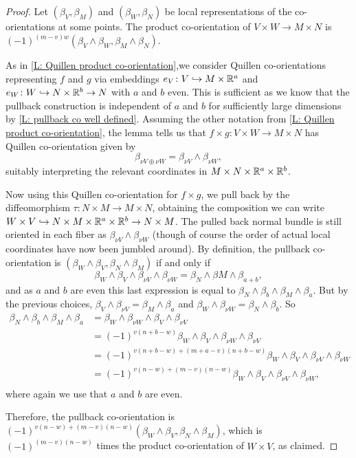 \begin{proof}
	Let $(\beta_V,\beta_M)$ and $(\beta_W,\beta_N)$ be local representations of the co-orientations at some points.
	The product co-orientation of $V \times W \to M \times N$ is $(-1)^{(m-v)w}(\beta_V \wedge \beta_W,\beta_M \wedge \beta_N)$.

	As in \cref{L: Quillen product co-orientation},we consider Quillen co-orientations representing $f$ and $g$ via embeddings $e_V \colon V \hookrightarrow M \times \mathbb{R}^a$ and $e_W \colon W \hookrightarrow N \times \mathbb{R}^b \to N$ with $a$ and $b$ even.
	This is sufficient as we know that the pullback construction is independent of $a$ and $b$ for sufficiently large dimensions by \cref{L: pullback co well defined}.
	Assuming the other notation from \cref{L: Quillen product co-orientation}, the lemma tells us that $f \times g \colon V \times W \to M \times N$ has Quillen co-orientation given by $$\beta_{\nu V \oplus \nu W} = \beta_{\nu V} \wedge \beta_{\nu W},$$
	suitably interpreting the relevant coordinates in $M \times N \times \mathbb{R}^a \times \mathbb{R}^b$.

	Now using this Quillen co-orientation for $f \times g$, we pull back by the diffeomorphism $\tau \colon N \times M \to M \times N$, obtaining the composition we can write $W \times V \hookrightarrow N \times M \times \mathbb{R}^a \times \mathbb{R}^b \to N \times M$.
	The pulled back normal bundle is still oriented in each fiber as $\beta_{\nu V} \wedge \beta_{\nu W}$ (though of course the order of actual local coordinates have now been jumbled around).
	By definition, the pullback co-orientation is $(\beta_W \wedge \beta_V,\beta_N \wedge \beta_M)$ if and only if $$\beta_W \wedge \beta_V \wedge \beta_{\nu V} \wedge \beta_{\nu W} = \beta_N \wedge \beta M \wedge \beta_{a+b},$$
	and as $a$ and $b$ are even this last expression is equal to
	$\beta_N \wedge \beta_b \wedge \beta_M \wedge \beta_{a}.$ But by the previous choices, $\beta_V \wedge \beta_{\nu V} = \beta_M \wedge \beta_a$ and $\beta_W \wedge \beta_{\nu W} = \beta_N \wedge \beta_b$.
	So
	\begin{align*}
		\beta_N \wedge \beta_b \wedge \beta_M \wedge \beta_{a}
		& = \beta_W \wedge \beta_{\nu W} \wedge \beta_V \wedge \beta_{\nu V} \\
		& = (-1)^{v(n+b-w)}\beta_W \wedge \beta_V \wedge \beta_{\nu W} \wedge \beta_{\nu V} \\
		& = (-1)^{v(n+b-w)+(m+a-v)(n+b-w)}\beta_W \wedge \beta_V \wedge \beta_{\nu V} \wedge \beta_{\nu W} \\
		& = (-1)^{v(n-w)+(m-v)(n-w)}\beta_W \wedge \beta_V \wedge \beta_{\nu V} \wedge \beta_{\nu W}, \\
	\end{align*}
	where again we use that $a$ and $b$ are even.

	Therefore, the pullback co-orientation is $(-1)^{v(n-w)+(m-v)(n-w)}(\beta_W \wedge \beta_V,\beta_N \wedge \beta_M)$, which is $(-1)^{(m-v)(n-w)}$ times the product co-orientation of $W \times V$, as claimed.
\end{proof}

